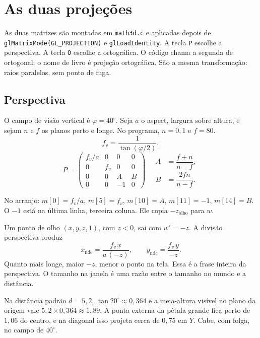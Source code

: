\documentclass[11pt,a4paper]{article}
\newcommand{\fn}[1]{\texttt{\nobreak\hspace{0pt}#1}}
\begin{document}
\section{As duas projeções}
\label{sec:proj}

As duas matrizes são montadas em \fn{math3d.c} e aplicadas depois de \fn{glMatrixMode(GL\_PROJECTION)} e \fn{glLoadIdentity}. A tecla \fn{P} escolhe a perspectiva. A tecla \fn{O} escolhe a ortográfica. O código chama a segunda de ortogonal; o nome de livro é projeção ortográfica. São a mesma transformação: raios paralelos, sem ponto de fuga.

\subsection{Perspectiva}

O campo de visão vertical é \(\varphi = 40^\circ\). Seja \(a\) o aspect, largura sobre altura, e sejam \(n\) e \(f\) os planos perto e longe. No programa, \(n = 0{,}1\) e \(f = 80\).
\begin{equation}
  f_{\!v} = \frac{1}{\tan(\varphi/2)},
  \label{eq:fovy}
\end{equation}
\begin{equation}
P =
\begin{pmatrix}
f_{\!v}/a & 0 & 0 & 0 \\
0 & f_{\!v} & 0 & 0 \\
0 & 0 & A & B \\
0 & 0 & -1 & 0
\end{pmatrix}
\quad
\begin{aligned}
A &= \dfrac{f+n}{n-f},\\[0.35em]
B &= \dfrac{2fn}{n-f}.
\end{aligned}
\label{eq:persp}
\end{equation}

No arranjo: \(m[0] = f_{\!v}/a\), \(m[5] = f_{\!v}\), \(m[10] = A\), \(m[11] = -1\), \(m[14] = B\). O \(-1\) está na última linha, terceira coluna. Ele copia \(-z_{\text{olho}}\) para \(w\).

Um ponto de olho \((x, y, z, 1)\), com \(z < 0\), sai com \(w' = -z\). A divisão perspectiva produz
\[
  x_{\mathrm{ndc}} = \frac{f_{\!v}\, x}{a\,(-z)},
  \qquad
  y_{\mathrm{ndc}} = \frac{f_{\!v}\, y}{-z}.
\]
Quanto mais longe, maior \(-z\), menor o ponto na tela. Essa é a frase inteira da perspectiva. O tamanho na janela é uma razão entre o tamanho no mundo e a distância.

Na distância padrão \(d = 5{,}2\), \(\tan 20^\circ \approx 0{,}364\) e a meia-altura visível no plano da origem vale \(5{,}2 \times 0{,}364 \approx 1{,}89\). A ponta externa da pétala grande fica perto de \(1{,}06\) do centro, e na diagonal isso projeta cerca de \(0{,}75\) em \(Y\). Cabe, com folga, no campo de \(40^\circ\).
\end{document}
